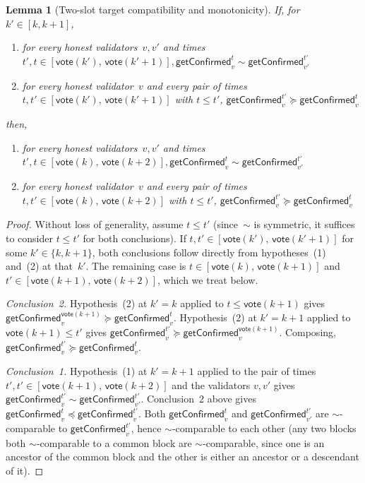 \documentclass{article}
\newcommand{\vote}{\mathsf{vote}}
\newcommand{\getConfirmed}{\textsf{getConfirmed}\xspace}
\theoremstyle{plain}
\newtheorem{lemma}{Lemma}
\theoremstyle{definition}
\theoremstyle{remark}
\begin{document}
\begin{lemma}[Two-slot target compatibility and monotonicity]\label{rev:lem:two-slot-target-compat-monotone}
  If, for $k' \in [k,k+1]$,
  \begin{enumerate}
    \item for every honest validators~$v,v'$ and times $t',t \in [\vote(k'),\, \vote(k'+1)], \getConfirmed_v^{t} \sim \getConfirmed_{v'}^{t'}$
    \item for every honest validator~$v$ and every pair of times $t, t' \in [\vote(k'),\, \vote(k'+1)]$ with $t \leq t'$, $\getConfirmed_v^{t'} \succeq \getConfirmed_v^t$
  \end{enumerate}
  then,
  \begin{enumerate}
    \item for every honest validators~$v,v'$ and times $t',t \in [\vote(k),\, \vote(k+2)], \getConfirmed_v^{t} \sim \getConfirmed_{v'}^{t'}$
    \item for every honest validator~$v$ and every pair of times $t, t' \in [\vote(k),\, \vote(k+2)]$ with $t \leq t'$, $\getConfirmed_v^{t'} \succeq \getConfirmed_v^t$
  \end{enumerate}  
\end{lemma}
\begin{proof}
Without loss of generality, assume $t \leq t'$ (since~$\sim$ is symmetric, it suffices to consider $t \leq t'$ for both conclusions). If $t, t' \in [\vote(k'),\, \vote(k'+1)]$ for some $k' \in \{k, k+1\}$, both conclusions follow directly from hypotheses~(1) and~(2) at that~$k'$. The remaining case is $t \in [\vote(k),\, \vote(k+1)]$ and $t' \in [\vote(k+1),\, \vote(k+2)]$, which we treat below.

\emph{Conclusion~2.}
Hypothesis~(2) at $k' = k$ applied to $t \leq \vote(k+1)$ gives $\getConfirmed_v^{\vote(k+1)} \succeq \getConfirmed_v^t$. Hypothesis~(2) at $k' = k+1$ applied to $\vote(k+1) \leq t'$ gives $\getConfirmed_v^{t'} \succeq \getConfirmed_v^{\vote(k+1)}$. Composing, $\getConfirmed_v^{t'} \succeq \getConfirmed_v^t$.

\emph{Conclusion~1.}
Hypothesis~(1) at $k' = k+1$ applied to the pair of times $t', t' \in [\vote(k+1),\, \vote(k+2)]$ and the validators $v, v'$ gives $\getConfirmed_v^{t'} \sim \getConfirmed_{v'}^{t'}$. Conclusion~2 above gives $\getConfirmed_v^t \preceq \getConfirmed_v^{t'}$. Both $\getConfirmed_v^t$ and $\getConfirmed_{v'}^{t'}$ are $\sim$-comparable to $\getConfirmed_v^{t'}$, hence $\sim$-comparable to each other (any two blocks both $\sim$-comparable to a common block are $\sim$-comparable, since one is an ancestor of the common block and the other is either an ancestor or a descendant of it).
\end{proof}
\end{document}
